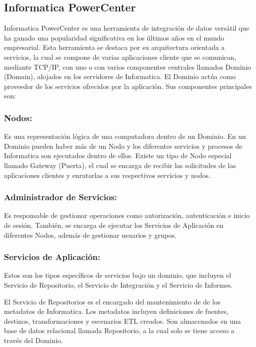 \subsection{Informatica PowerCenter}

Informatica PowerCenter es una herramienta de integración de datos versátil que ha ganado una popularidad significativa 
en los últimos años en el mundo empresarial. Esta herramienta se destaca por su arquitectura orientada a servicios, 
la cual se compone de varias aplicaciones cliente que se comunican, mediante TCP/IP, con uno o con varios componentes 
centrales llamados Dominio (Domain), alojados en los servidores de Informatica. El Dominio actúa como proveedor de los 
servicios ofrecidos por la aplicación. Sus componentes principales son: 

\subsubsection{Nodos:} 

Es una representación lógica de una computadora dentro de un Dominio. En un Dominio pueden haber m\'as de un Nodo y 
los diferentes servicios y procesos de Informatica son ejecutados dentro de ellos. Existe un tipo de Nodo especial 
llamado Gateway (Puerta), el cual se encarga de recibir las solicitudes de las aplicaciones clientes y enrutarlas a sus 
respectivos servicios y nodos.

\subsubsection{Administrador de Servicios:} 

Es responsable de gestionar operaciones como autorización, autenticación e inicio de sesión. También, se encarga de 
ejecutar los Servicios de Aplicaci\'on en diferentes Nodos, además de gestionar usuarios y grupos.

\subsubsection{Servicios de Aplicaci\'on:}

Estos son los tipos específicos de servicios bajo un dominio, que incluyen el Servicio de Repositorio, el Servicio de 
Integración y el Servicio de Informes.

El Servicio de Repositorios es el encargado del mantenimiento de de los metadatos de Informatica. Los metadatos incluyen 
definiciones de fuentes, destinos, transformaciones y escenarios ETL creados. Son almacenados en una base de datos 
relacional llamada Repositorio, a la cual solo se tiene acceso a través del Dominio.

